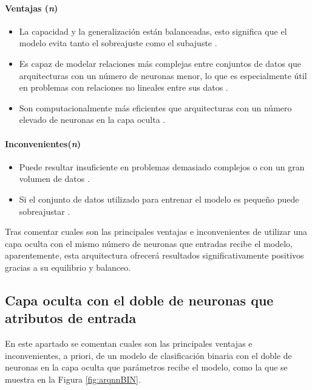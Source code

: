 \paragraph{Ventajas (\textit{n})}
\begin{itemize}
	\item La capacidad y la generalización están balanceadas, esto significa que el modelo evita tanto el sobreajuste como el subajuste \cite{zhang2016understanding}.
	\item Es capaz de modelar relaciones más complejas entre conjuntos de datos que arquitecturas con un número de neuronas menor, lo que es especialmente útil en problemas con relaciones no lineales entre sus datos \cite{goodfellow2016deep}.
	\item Son computacionalmente más eficientes que arquitecturas con un número elevado de neuronas en la capa oculta \cite{bengio2006greedy}. 
\end{itemize}
\paragraph{Inconvenientes(\textit{n})}
\begin{itemize}
	\item Puede resultar insuficiente en problemas demasiado complejos o con un gran volumen de datos \cite{hochreiter1997long}.
	\item Si el conjunto de datos utilizado para entrenar el modelo es pequeño puede sobreajustar \cite{yamada2018understanding}.
\end{itemize}

Tras comentar cuales son las principales ventajas e inconvenientes de utilizar una capa oculta con el mismo número de neuronas que entradas recibe el modelo, aparentemente, esta arquitectura ofrecerá resultados significativamente positivos gracias a su equilibrio y balanceo.

\subsection{Capa oculta con el doble de neuronas que atributos de entrada}\label{sec:VIBIN98}
En este apartado se comentan cuales son las principales ventajas e inconvenientes, a priori, de un modelo de clasificación binaria con el doble de neuronas en la capa oculta que parámetros recibe el modelo, como la que se muestra en la Figura \ref{fig:arqnnBIN}.

